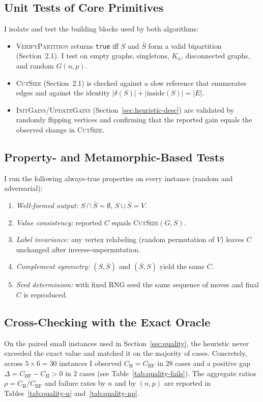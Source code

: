 \documentclass[12pt]{article}
\begin{document}
\subsection{Unit Tests of Core Primitives}
I isolate and test the building blocks used by both algorithms:
\begin{itemize}
    \item \textsc{VerifyPartition} returns \texttt{true} iff $S$ and $\bar S$ form a valid bipartition (Section~2.1). I test on empty graphs, singletons, $K_n$, disconnected graphs, and random $G(n,p)$.
    \item \textsc{CutSize} (Section~2.1) is checked against a slow reference that enumerates edges and against the identity $|\delta(S)|+|\text{inside}(S)|=|E|$.
    \item \textsc{InitGains}/\textsc{UpdateGains} (Section~\ref{sec:heuristic-desc}) are validated by randomly flipping vertices and confirming that the reported gain equals the observed change in \textsc{CutSize}.
\end{itemize}

\subsection{Property- and Metamorphic-Based Tests}
I run the following always-true properties on every instance (random and adversarial):
\begin{enumerate}
    \item \emph{Well-formed output:} $S\cap\bar S=\emptyset$, $S\cup\bar S=V$.
    \item \emph{Value consistency:} reported $C$ equals \textsc{CutSize}$(G,S)$.
    \item \emph{Label invariance:} any vertex relabeling (random permutation of $V$) leaves $C$ unchanged after inverse-unpermutation.
    \item \emph{Complement symmetry:} $(S,\bar S)$ and $(\bar S,S)$ yield the same $C$.
    \item \emph{Seed determinism:} with fixed RNG seed the same sequence of moves and final $C$ is reproduced.
\end{enumerate}

\subsection{Cross-Checking with the Exact Oracle}
On the paired small instances used in Section~\ref{sec:quality}, the heuristic never exceeded the exact value and matched it on the majority of cases. Concretely, across $5\times 6=30$ instances I observed $C_{\mathrm{H}}=C_{\mathrm{BF}}$ in $28$ cases and a positive gap $\Delta=C_{\mathrm{BF}}-C_{\mathrm{H}}>0$ in $2$ cases (see Table~\ref{tab:quality-fails}). The aggregate ratios $\rho=C_{\mathrm{H}}/C_{\mathrm{BF}}$ and failure rates by $n$ and by $(n,p)$ are reported in Tables~\ref{tab:quality-n} and~\ref{tab:quality-np}.
\end{document}
